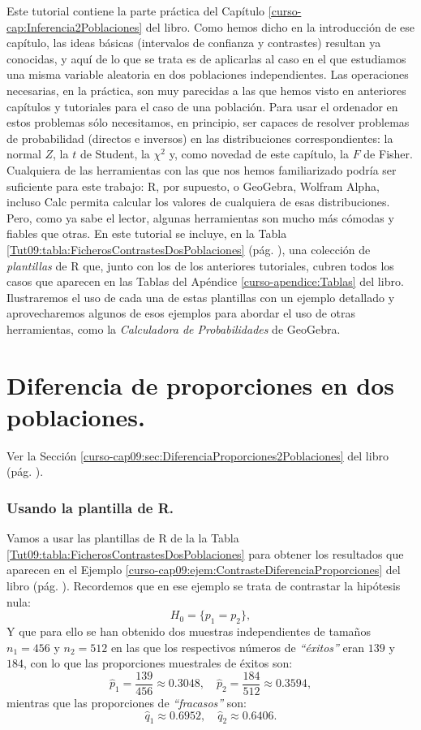 \documentclass[10pt,a4paper]{article}\usepackage[]{graphicx}\usepackage[]{color}
\newcounter {cont01}
\begin{document}
Este tutorial contiene la parte práctica del Capítulo \ref{curso-cap:Inferencia2Poblaciones} del libro. Como hemos dicho en la introducción de ese capítulo, las ideas básicas (intervalos de confianza y contrastes) resultan ya conocidas, y aquí de lo que se trata es de aplicarlas al caso en el que estudiamos una misma variable aleatoria en dos poblaciones independientes. Las operaciones necesarias, en la práctica, son muy parecidas a las que hemos visto en anteriores capítulos y tutoriales para el caso de una población. Para usar el ordenador en estos problemas sólo necesitamos, en principio, ser capaces de resolver problemas de probabilidad (directos e inversos) en las distribuciones correspondientes: la normal $Z$, la $t$ de Student, la $\chi^2$ y, como novedad de este capítulo, la $F$ de Fisher. Cualquiera de las herramientas con las que nos hemos familiarizado podría ser suficiente para este trabajo: R, por supuesto, o GeoGebra, Wolfram Alpha, incluso Calc permita calcular los valores de cualquiera de esas distribuciones. Pero, como ya sabe el lector, algunas herramientas son mucho más cómodas y fiables que otras. En este tutorial se incluye, en la Tabla \ref{Tut09:tabla:FicherosContrastesDosPoblaciones} (pág. \pageref{Tut09:tabla:FicherosContrastesDosPoblaciones}), una colección de {\em plantillas} de R que, junto con los de los anteriores tutoriales, cubren todos los casos que aparecen en las Tablas del Apéndice \ref{curso-apendice:Tablas} del libro.  Ilustraremos el uso de cada una de estas plantillas con un ejemplo detallado y aprovecharemos algunos de esos ejemplos para abordar el uso de otras herramientas, como la {\em Calculadora de Probabilidades} de GeoGebra.

\section{Diferencia de proporciones en dos poblaciones.}
\label{tut09:sec:DifProporcionesDosPoblaciones.}

Ver la Sección \ref{curso-cap09:sec:DiferenciaProporciones2Poblaciones} del libro (pág. \pageref{curso-cap09:sec:DiferenciaProporciones2Poblaciones}).

\subsubsection*{Usando la plantilla de R.}

Vamos a usar las plantillas de R de la la Tabla \ref{Tut09:tabla:FicherosContrastesDosPoblaciones} para obtener los resultados que aparecen en el Ejemplo \ref{curso-cap09:ejem:ContrasteDiferenciaProporciones} del libro (pág. \pageref{curso-cap09:ejem:ContrasteDiferenciaProporciones}). Recordemos que en ese ejemplo se trata de contrastar la hipótesis nula:
\[H_0=\{p_1 = p_2\},\]
Y que para ello se han obtenido dos muestras independientes de
tamaños $n_1=456$ y $n_2 = 512$ en las que los respectivos números de {\em ``éxitos''} eran $139$ y $184$, con lo que las proporciones muestrales de éxitos son:
\[\hat p_1 = \dfrac{139}{456}\approx 0.3048, \quad \hat p_2 = \dfrac{184}{512}\approx 0.3594,\]
mientras que las proporciones de {\em ``fracasos''} son:
\[\hat q_1 \approx 0.6952, \quad \hat q_2 \approx 0.6406.\]
\end{document}
